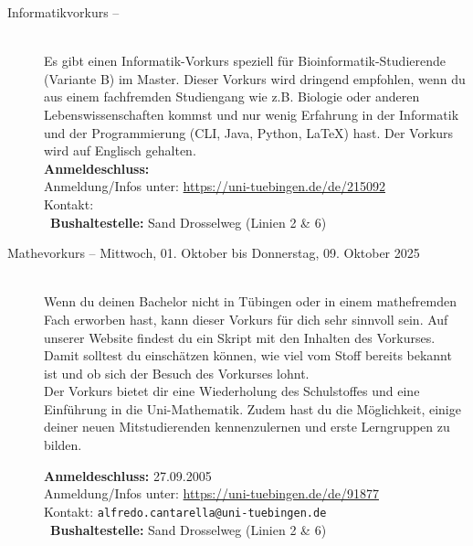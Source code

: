 \begin{description}
\ifmaster
    \ifbinfo
        \item[Informatikvorkurs -- \bioinfoDatum~\YEAR]\ \\
        Es gibt einen Informatik-Vorkurs speziell für Bioinformatik-Studierende (Variante B) im Master. 
        Dieser Vorkurs wird dringend empfohlen, wenn du aus einem fachfremden Studiengang wie z.B. Biologie oder anderen Lebenswissenschaften kommst und nur wenig Erfahrung in der Informatik und der Programmierung (CLI, Java, Python, \LaTeX) hast. Der Vorkurs wird auf Englisch gehalten. \\
        \textbf{Anmeldeschluss:} \bioinfoAnmeldung\YEAR\\
        Anmeldung/Infos unter: \url{https://uni-tuebingen.de/de/215092}\\
        Kontakt: \texttt{\bioinfoKontakt}\\
        ~\textbf{Bushaltestelle:} Sand Drosselweg (Linien 2 \& 6)
    \fi
\fi

\ifmaster
    \ifml %
    \else
        \ifkogwiss %
        \else
            \iflehramt %
            \else
                \item[Mathevorkurs -- Mittwoch, 01. Oktober bis Donnerstag, 09. Oktober 2025]~\\
                Wenn du deinen Bachelor nicht in Tübingen oder in einem mathefremden Fach erworben hast, kann dieser Vorkurs für dich sehr sinnvoll sein. Auf unserer Website findest du ein Skript mit den Inhalten des Vorkurses. Damit solltest du einschätzen können, wie viel vom Stoff bereits bekannt ist und ob sich der Besuch des Vorkurses lohnt.\smallskip \\
                Der Vorkurs bietet dir eine Wiederholung des Schulstoffes und eine Einführung in die Uni-Mathematik. Zudem hast du die Möglichkeit, einige deiner neuen Mitstudierenden kennenzulernen und erste Lerngruppen zu bilden.

                \textbf{Anmeldeschluss:} 27.09.2005\\
                Anmeldung/Infos unter: \url{https://uni-tuebingen.de/de/91877}\\
                Kontakt: \texttt{alfredo.cantarella@uni-tuebingen.de}
                \ifsommersemester
                    \\ ~\textbf{Bushaltestelle:} Sand Drosselweg (Linien 2 \& 6)
                \fi
            \fi
        \fi
    \fi
\fi


\end{description}
